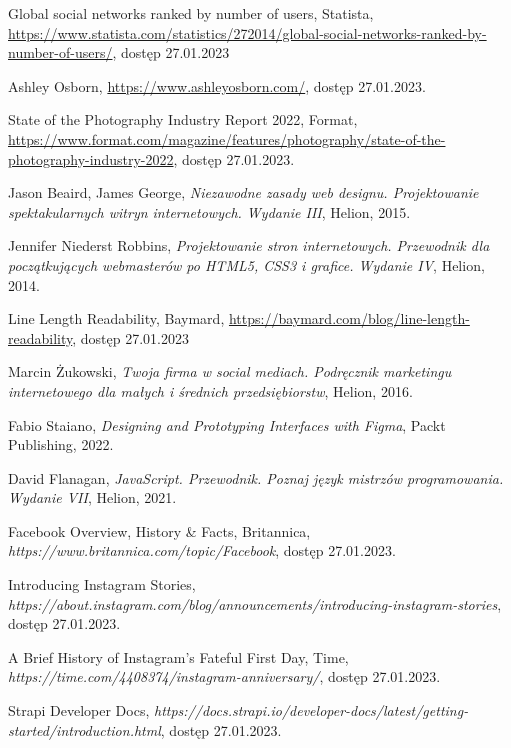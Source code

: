\documentclass[12pt]{article}
\numberwithin{figure}{section}
\begin{document}
\begin{sloppypar}
\begin{thebibliography}{99}
    Global social networks ranked by number of users, Statista,
    \url{https://www.statista.com/statistics/272014/global-social-networks-ranked-by-number-of-users/},
    dostęp 27.01.2023

    Ashley Osborn,
    \url{https://www.ashleyosborn.com/},
    dostęp 27.01.2023.

    State of the Photography Industry Report 2022, Format,
    \url{https://www.format.com/magazine/features/photography/state-of-the-photography-industry-2022},
    dostęp 27.01.2023.

    Jason Beaird, James George,
    \textit{Niezawodne zasady web designu. Projektowanie spektakularnych witryn internetowych. Wydanie III},
    Helion,
    2015.

    Jennifer Niederst Robbins,
    \textit{Projektowanie stron internetowych. Przewodnik dla początkujących webmasterów po HTML5, CSS3 i grafice. Wydanie IV},
    Helion,
    2014.

    Line Length Readability, Baymard,
    \url{https://baymard.com/blog/line-length-readability},
    dostęp 27.01.2023

    Marcin Żukowski,
    \textit{Twoja firma w social mediach. Podręcznik marketingu internetowego dla małych i średnich przedsiębiorstw},
    Helion,
    2016.

    Fabio Staiano,
    \textit{Designing and Prototyping Interfaces with Figma},
    Packt Publishing,
    2022.

    David Flanagan,
    \textit{JavaScript. Przewodnik. Poznaj język mistrzów programowania. Wydanie VII},
    Helion,
    2021.

    Facebook Overview, History \& Facts, Britannica,
    \textit{https://www.britannica.com/topic/Facebook},
    dostęp 27.01.2023.

    Introducing Instagram Stories,
    \textit{https://about.instagram.com/blog/announcements/introducing-instagram-stories},
    dostęp 27.01.2023.

    A Brief History of Instagram's Fateful First Day, Time,
    \textit{https://time.com/4408374/instagram-anniversary/},
    dostęp 27.01.2023.

    Strapi Developer Docs,
    \textit{https://docs.strapi.io/developer-docs/latest/getting-started/introduction.html},
    dostęp 27.01.2023.


\end{thebibliography}
\end{sloppypar}
\end{document}
